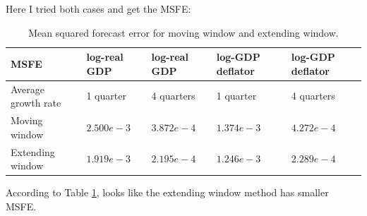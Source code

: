 \documentclass[11pt, oneside]{article}   	%
\begin{document}
\begin{enumerate}[(1)]
Here I tried both cases and get the MSFE:
\begin{table}[!ht]
\center
\captionsetup{width=0.8\textwidth}
\begin{tabularx}{0.8\textwidth}{|X|X|X|X|X|} \hline 
MSFE & log-real GDP & log-real GDP & log-GDP deflator & log-GDP deflator \\ \hline
 Average growth rate & 1 quarter & 4 quarters & 1 quarter & 4 quarters \\ \hline
 Moving window & $2.500e-3$ & $3.872e-4$ & $1.374e-3$ & $4.272e-4$	\\ \hline
 Extending window & $1.919e-3$ & $2.195e-4$ & $1.246e-3$ & $2.289e-4$ \\ \hline 
 \end{tabularx} 
\caption{Mean squared forecast error for moving window and extending window.}
\label{table:MSFE_flat_pri}
\end{table}

According to Table \ref{table:MSFE_flat_pri}, looks like the extending window method has smaller MSFE.


\end{enumerate}
\end{document}
